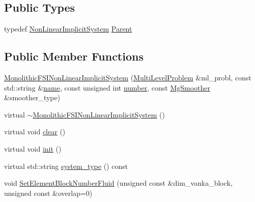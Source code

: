 \subsection*{Public Types}
\begin{DoxyCompactItemize}
\item 
typedef \mbox{\hyperlink{classfemus_1_1_non_linear_implicit_system}{Non\+Linear\+Implicit\+System}} \mbox{\hyperlink{classfemus_1_1_monolithic_f_s_i_non_linear_implicit_system_ac9effcc16eb9a19fa306a9e5f078569b}{Parent}}
\end{DoxyCompactItemize}
\subsection*{Public Member Functions}
\begin{DoxyCompactItemize}
\item 
\mbox{\hyperlink{classfemus_1_1_monolithic_f_s_i_non_linear_implicit_system_a9b54865456324fbbf6dcad52f270f305}{Monolithic\+F\+S\+I\+Non\+Linear\+Implicit\+System}} (\mbox{\hyperlink{classfemus_1_1_multi_level_problem}{Multi\+Level\+Problem}} \&ml\+\_\+probl, const std\+::string \&\mbox{\hyperlink{classfemus_1_1_system_a1a007c176529dae649887bbd1cb46103}{name}}, const unsigned int \mbox{\hyperlink{classfemus_1_1_system_a28f5c7f6286dd597ae28a8923c8dca11}{number}}, const \mbox{\hyperlink{_mg_smoother_enum_8hpp_a4d11c2ff93e2f0f440c879a9c40cda71}{Mg\+Smoother}} \&smoother\+\_\+type)
\item 
virtual \mbox{\hyperlink{classfemus_1_1_monolithic_f_s_i_non_linear_implicit_system_a256c476e4c991fc6ee8e699e499313f0}{$\sim$\+Monolithic\+F\+S\+I\+Non\+Linear\+Implicit\+System}} ()
\item 
virtual void \mbox{\hyperlink{classfemus_1_1_monolithic_f_s_i_non_linear_implicit_system_ac7f2bedf4d1c6b00f5443cb5128a3069}{clear}} ()
\item 
virtual void \mbox{\hyperlink{classfemus_1_1_monolithic_f_s_i_non_linear_implicit_system_a07e04a8cce138cae9edcdd05fd1c7829}{init}} ()
\item 
virtual std\+::string \mbox{\hyperlink{classfemus_1_1_monolithic_f_s_i_non_linear_implicit_system_a29bb0bdaf1eec888af05e8e57469faf4}{system\+\_\+type}} () const
\item 
void \mbox{\hyperlink{classfemus_1_1_monolithic_f_s_i_non_linear_implicit_system_abbcaf72156593c16e27f9554ed8a884a}{Set\+Element\+Block\+Number\+Fluid}} (unsigned const \&dim\+\_\+vanka\+\_\+block, unsigned const \&overlap=0)
\item 

\end{DoxyCompactItemize}
